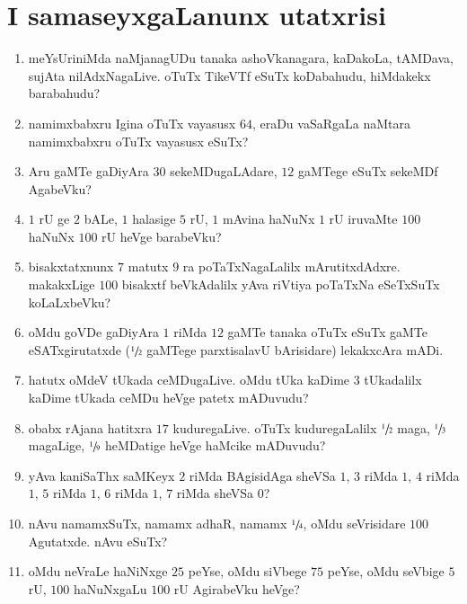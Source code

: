 \chapter{I samaseyxgaLanunx utatxrisi}

\begin{enumerate}
  \renewcommand{\labelenumi}{\rm(\theenumi)}
  \itemsep=2pt
\item meYsUriniMda naMjanagUDu tanaka ashoVkanagara, kaDakoLa, tAMDava, sujAta nilAdxNagaLive. oTuTx TikeVTf eSuTx koDabahudu, hiMdakekx barabahudu?

\item namimxbabxru Igina oTuTx vayasusx $64$, eraDu vaSaRgaLa naMtara namimxbabxru oTuTx vayasusx eSuTx?

\item Aru gaMTe gaDiyAra $30$ sekeMDugaLAdare, $12$ gaMTege eSuTx sekeMDf AgabeVku?

\item $1$ rU ge $2$ bALe, $1$ halasige $5$ rU, $1$ mAvina haNuNx $1$ rU iruvaMte $100$ haNuNx $100$ rU heVge barabeVku?

\item bisakxtatxnunx $7$ matutx $9$ ra poTaTxNagaLalilx mArutitxdAdxre. makakxLige $100$ bisakxtf beVkAdalilx yAva riVtiya poTaTxNa eSeTxSuTx koLaLxbeVku?

\item oMdu goVDe gaDiyAra $1$ riMda $12$ gaMTe tanaka oTuTx eSuTx gaMTe eSATxgirutatxde ($\sfrac{1}{2}$ gaMTege parxtisalavU bArisidare) lekakxcAra mADi.

\item hatutx oMdeV tUkada ceMDugaLive. oMdu tUka kaDime $3$ tUkadalilx kaDime tUkada ceMDu heVge patetx mADuvudu?

\item obabx rAjana hatitxra $17$ kuduregaLive. oTuTx kuduregaLalilx $\sfrac{1}{2}$ maga, $\sfrac{1}{3}$ magaLige, $\sfrac{1}{9}$ heMDatige heVge haMcike mADuvudu?

\item yAva kaniSaThx saMKeyx $2$ riMda BAgisidAga sheVSa $1$, $3$ riMda $1$, $4$ riMda $1$, $5$ riMda $1$, $6$ riMda $1$, $7$ riMda sheVSa $0$?

\item nAvu namamxSuTx, namamx adhaR, namamx $\sfrac{1}{4}$, oMdu seVrisidare $100$ Agutatxde. nAvu eSuTx?

\item oMdu neVraLe haNiNxge $25$ peYse, oMdu siVbege $75$ peYse, oMdu seVbige $5$ rU, $100$ haNuNxgaLu $100$ rU AgirabeVku heVge?


\end{enumerate}
